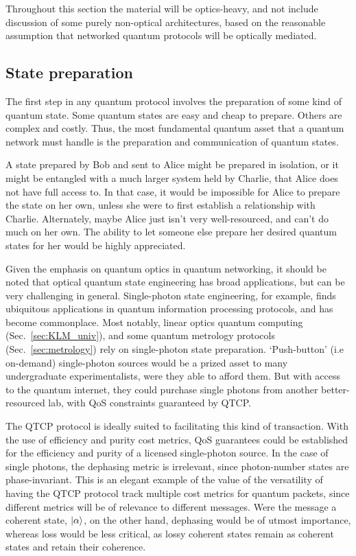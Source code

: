 Throughout this section the material will be optics-heavy, and not include discussion of some purely non-optical architectures, based on the reasonable assumption that networked quantum protocols will be optically mediated.


%
%

\subsection{State preparation} 

The first step in any quantum protocol involves the preparation of some kind of quantum state. Some quantum states are easy and cheap to prepare. Others are complex and costly. Thus, the most fundamental quantum asset that a quantum network must handle is the preparation and communication of quantum states.

A state prepared by Bob and sent to Alice might be prepared in isolation, or it might be entangled with a much larger system held by Charlie, that Alice does not have full access to. In that case, it would be impossible for Alice to prepare the state on her own, unless she were to first establish a relationship with Charlie. Alternately, maybe Alice just isn't very well-resourced, and can't do much on her own. The ability to let someone else prepare her desired quantum states for her would be highly appreciated.

Given the emphasis on quantum optics in quantum networking, it should be noted that optical quantum state engineering has broad applications, but can be very challenging in general. Single-photon state engineering, for example, finds ubiquitous applications in quantum information processing protocols, and has become commonplace. Most notably, linear optics quantum computing (Sec.~\ref{sec:KLM_univ}), and some quantum metrology protocols (Sec.~\ref{sec:metrology}) rely on single-photon state preparation. `Push-button' (i.e on-demand) single-photon sources would be a prized asset to many undergraduate experimentalists, were they able to afford them. But with access to the quantum internet, they could purchase single photons from another better-resourced lab, with QoS constraints guaranteed by QTCP.

The QTCP protocol is ideally suited to facilitating this kind of transaction. With the use of efficiency and purity cost metrics, QoS guarantees could be established for the efficiency and purity of a licensed single-photon source. In the case of single photons, the dephasing metric is irrelevant, since photon-number states are phase-invariant. This is an elegant example of the value of the versatility of having the QTCP protocol track multiple cost metrics for quantum packets, since different metrics will be of relevance to different messages. Were the message a coherent state, $|\alpha\rangle$, on the other hand, dephasing would be of utmost importance, whereas loss would be less critical, as lossy coherent states remain as coherent states and retain their coherence.

